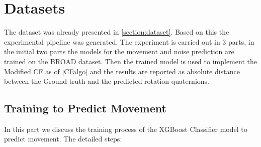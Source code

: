 \documentclass{iutbscthesis}
\begin{document}
\section{Datasets}
The dataset was already presented in \autoref{section:dataset}. Based on this the experimental pipeline was generated. The experiment is carried out in 3 parts, in the initial two parts the models for the movement and noise prediction are trained on the BROAD\cite{BROAD} dataset. Then the trained model is used to implement the Modified CF as of \autoref{CFalgo} and the results are reported as absolute distance between the Ground truth and the predicted rotation quaternions\cite{absoluteDistance}.



\subsection{Training to Predict Movement}
In this part we discuss the training process of the XGBoost Classifier model to predict movement. The detailed steps:
\end{document}
